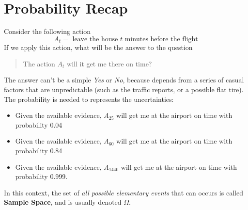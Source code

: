\documentclass[10pt, letterpaper]{report}
\begin{document}
\section{Probability Recap}
Consider the following action\begin{equation}
    A_t=\text{ leave the house $t$ minutes before the flight}
\end{equation}
If we apply this action, what will be the answer to the question\begin{quote}
    The action $A_t$ will it get me there on time?
\end{quote}
The answer can't be a simple \textit{Yes} or \textit{No}, because depends from a series of casual factors that are unpredictable (such as the traffic reports, or a possible flat tire). The probability is needed to represents the uncertainties:\begin{itemize}
\item Given the available evidence, $A_{25}$ will get me at the airport on time with
probability 0.04
 \item Given the available evidence, $A_{60}$ will get me at the airport on time with
probability 0.84
 \item Given the available evidence, $A_{1440}$ will get me at the airport on time with
probability 0.999.
\end{itemize}
In this context, the set of \textit{all possible elementary events} that can occurs is called \textbf{Sample Space}, and is usually denoted $\Omega$.
\end{document}
